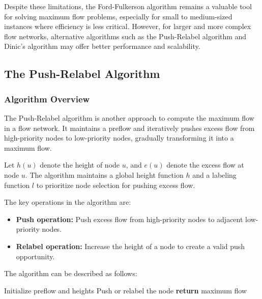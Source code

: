 \documentclass[12pt]{book} %
\begin{document}
Despite these limitations, the Ford-Fulkerson algorithm remains a valuable tool for solving maximum flow problems, especially for small to medium-sized instances where efficiency is less critical. However, for larger and more complex flow networks, alternative algorithms such as the Push-Relabel algorithm and Dinic's algorithm may offer better performance and scalability.

\subsection{The Push-Relabel Algorithm}

\subsubsection{Algorithm Overview}

The Push-Relabel algorithm is another approach to compute the maximum flow in a flow network. It maintains a preflow and iteratively pushes excess flow from high-priority nodes to low-priority nodes, gradually transforming it into a maximum flow.

Let $h(u)$ denote the height of node $u$, and $e(u)$ denote the excess flow at node $u$. The algorithm maintains a global height function $h$ and a labeling function $l$ to prioritize node selection for pushing excess flow.

The key operations in the algorithm are:

\begin{itemize}
    \item \textbf{Push operation:} Push excess flow from high-priority nodes to adjacent low-priority nodes.
    \item \textbf{Relabel operation:} Increase the height of a node to create a valid push opportunity.
\end{itemize}

The algorithm can be described as follows:

\begin{algorithm}
\caption{Push-Relabel Algorithm}
\begin{algorithmic}[1]
    \State Initialize preflow and heights
        \State Push or relabel the node
    \EndWhile
    \State \textbf{return} maximum flow
\EndFunction
\end{algorithmic}
\end{algorithm}
\end{document}
